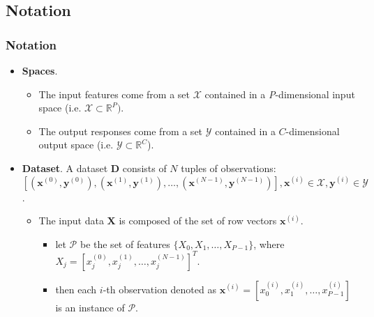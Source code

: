 \documentclass[11pt, 
               aspectratio=169
               ]{beamer}
\begin{document}
	\subsection{Notation}
	
		\begin{frame}
		
			\frametitle{Notation}
			
				\begin{itemize}
					\item \textbf{Spaces}.  
					\begin{itemize}
						\item The input features come from a set  $\mathcal{X}$ contained in a \textit{P}-dimensional input space (i.e. $\mathcal{X} \subset \mathbb{R}^P)$.  
						\item The output responses come from a set $\mathcal{Y}$ contained in a $C$-dimensional output space (i.e. $\mathcal{Y} \subset \mathbb{R}^C$).
					\end{itemize}	
					\bigskip	
					\item \textbf{Dataset}. A dataset $\mathbf{D}$ consists of $N$ tuples of observations:\\ $[(\mathbf{x}^{(0)},\mathbf{y}^{(0)}), (\mathbf{x}^{(1)},\mathbf{y}^{(1)}), \dots, (\mathbf{x}^{(N-1)},\mathbf{y}^{(N-1)})], \mathbf{x}^{(i)} \in \mathcal{X}, \mathbf{y}^{(i)} \in \mathcal{Y}$.\\
					\begin{itemize}
						\item The input data $\mathbf{X}$ is composed of the set of row vectors $\mathbf{x}^{(i)}$. 
						\begin{itemize}
							\item let $\mathcal{P}$ be the set of features  $\{X_0, X_1, \dots, X_{P-1}\}$, where $X_j = \left[x_{j}^{(0)}, x_{j}^{(1)}, \dots, x_{j}^{(N-1)} \right]^T$.
							\item then each $i$-th observation denoted as $\mathbf{x}^{(i)} = \left[x_0^{(i)}, x_1^{(i)}, \dots, x_{P-1}^{(i)} \right]$ is an instance of $\mathcal{P}$.
						\end{itemize}
				\end{itemize}
			\end{itemize}
		
		\end{frame}

\end{document}
